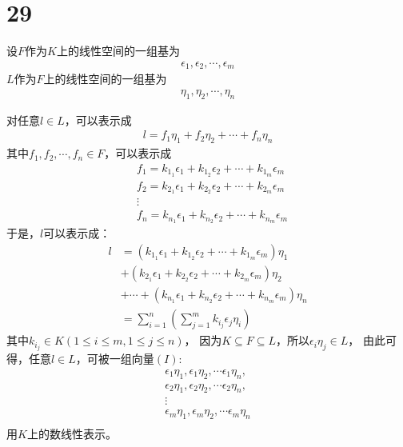 \documentclass{article}
\begin{document}
\section*{29}

设$F$作为$K$上的线性空间的一组基为
\begin{align*}
  \epsilon_1, \epsilon_2, \cdots, \epsilon_m
\end{align*}
$L$作为$F$上的线性空间的一组基为
\begin{align*}
  \eta_1, \eta_2, \cdots, \eta_n
\end{align*}

对任意$l \in L$，可以表示成
\begin{align*}
  l = f_1 \eta_1 + f_2 \eta_2 + \cdots + f_n \eta_n
\end{align*}
其中$f_1, f_2, \cdots, f_n \in F$，可以表示成
\begin{align*}
   & f_1 = k_{1_1} \epsilon_1 + k_{1_2} \epsilon_2 + \cdots + k_{1_m} \epsilon_m \\
   & f_2 = k_{2_1} \epsilon_1 + k_{2_2} \epsilon_2 + \cdots + k_{2_m} \epsilon_m \\
   & \vdots                                                                      \\
   & f_n = k_{n_1} \epsilon_1 + k_{n_2} \epsilon_2 + \cdots + k_{n_m} \epsilon_m
\end{align*}
于是，$l$可以表示成：
\begin{align*}
  l & = (k_{1_1} \epsilon_1 + k_{1_2} \epsilon_2 + \cdots + k_{1_m} \epsilon_m)\eta_1          \\
    & + (k_{2_1} \epsilon_1 + k_{2_2} \epsilon_2 + \cdots + k_{2_m} \epsilon_m)\eta_2          \\
    & + \cdots + (k_{n_1} \epsilon_1 + k_{n_2} \epsilon_2 + \cdots + k_{n_m} \epsilon_m)\eta_n \\
    & = \sum \limits_{i = 1}^n \left(\sum\limits_{j=1}^m k_{i_j} \epsilon_{j} \eta_i\right)
\end{align*}
其中$k_{i_j} \in K (1 \leq i \leq m, 1 \leq j \leq n)$，
因为$K \subseteq F \subseteq L$，所以$\epsilon_i \eta_j \in L$，
由此可得，任意$l \in L$，可被一组向量$(I)$:
\begin{align*}
  \epsilon_1 \eta_1, \epsilon_1 \eta_2, \cdots \epsilon_1 \eta_n, \\
  \epsilon_2 \eta_1, \epsilon_2 \eta_2, \cdots \epsilon_2 \eta_n, \\
  \vdots                                                          \\
  \epsilon_m \eta_1, \epsilon_m \eta_2, \cdots \epsilon_m \eta_n  \\
\end{align*}
用$K$上的数线性表示。
\end{document}
